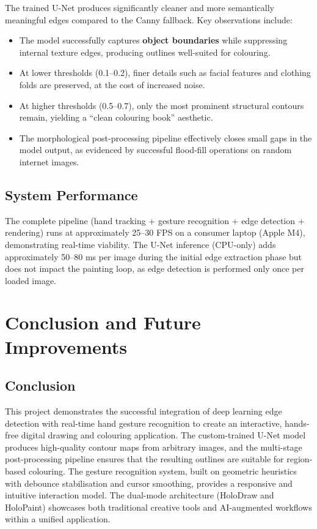\documentclass[12pt, a4paper]{article}
\begin{document}
The trained U-Net produces significantly cleaner and more semantically meaningful edges compared to the Canny fallback.
Key observations include:

\begin{itemize}[nosep]
    \item The model successfully captures \textbf{object boundaries} while suppressing internal texture edges, producing outlines well-suited for colouring.
    \item At lower thresholds (0.1--0.2), finer details such as facial features and clothing folds are preserved, at the cost of increased noise.
    \item At higher thresholds (0.5--0.7), only the most prominent structural contours remain, yielding a ``clean colouring book'' aesthetic.
    \item The morphological post-processing pipeline effectively closes small gaps in the model output, as evidenced by successful flood-fill operations on random internet images.
\end{itemize}

\subsection{System Performance}

The complete pipeline (hand tracking + gesture recognition + edge detection + rendering) runs at approximately 25--30 FPS on a consumer laptop (Apple M4), demonstrating real-time viability.
The U-Net inference (CPU-only) adds approximately 50--80 ms per image during the initial edge extraction phase but does not impact the painting loop, as edge detection is performed only once per loaded image.

\section{Conclusion and Future Improvements}

\subsection{Conclusion}

This project demonstrates the successful integration of deep learning edge detection with real-time hand gesture recognition to create an interactive, hands-free digital drawing and colouring application.
The custom-trained U-Net model produces high-quality contour maps from arbitrary images, and the multi-stage post-processing pipeline ensures that the resulting outlines are suitable for region-based colouring.
The gesture recognition system, built on geometric heuristics with debounce stabilisation and cursor smoothing, provides a responsive and intuitive interaction model.
The dual-mode architecture (HoloDraw and HoloPaint) showcases both traditional creative tools and AI-augmented workflows within a unified application.
\end{document}
